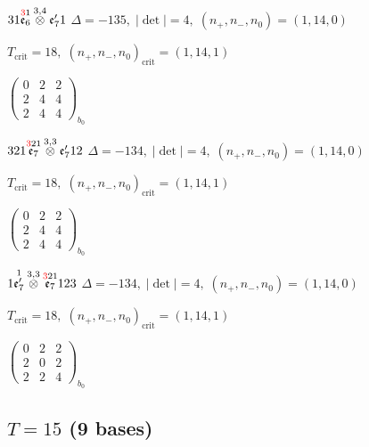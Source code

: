 \documentclass[10pt]{article}
\begin{document}
\smallskip

$31\overset{\textcolor{red}{3}1}{\mathfrak{e}_6}\overset{3,4}{\otimes}\mathfrak{e}_7'1$ \quad $\Delta=-135,\; |\det|=4,\; (n_+,n_-,n_0)=(1,14,0)$

\hspace{1em}$T_{\text{crit}}=18,\; (n_+,n_-,n_0)_{\text{crit}}=(1,14,1)$

\hspace{2em}$\left(\begin{smallmatrix}0 & 2 & 2 \\ 2 & 4 & 4 \\ 2 & 4 & 4\end{smallmatrix}\right)_{\!b_0}$

\smallskip

$321\overset{\textcolor{red}{3}21}{\mathfrak{e}_7}\overset{3,3}{\otimes}\mathfrak{e}_7'12$ \quad $\Delta=-134,\; |\det|=4,\; (n_+,n_-,n_0)=(1,14,0)$

\hspace{1em}$T_{\text{crit}}=18,\; (n_+,n_-,n_0)_{\text{crit}}=(1,14,1)$

\hspace{2em}$\left(\begin{smallmatrix}0 & 2 & 2 \\ 2 & 4 & 4 \\ 2 & 4 & 4\end{smallmatrix}\right)_{\!b_0}$

\smallskip

$1\overset{1}{\mathfrak{e}_7'}\overset{3,3}{\otimes}\overset{\textcolor{red}{3}21}{\mathfrak{e}_7}123$ \quad $\Delta=-134,\; |\det|=4,\; (n_+,n_-,n_0)=(1,14,0)$

\hspace{1em}$T_{\text{crit}}=18,\; (n_+,n_-,n_0)_{\text{crit}}=(1,14,1)$

\hspace{2em}$\left(\begin{smallmatrix}0 & 2 & 2 \\ 2 & 0 & 2 \\ 2 & 2 & 4\end{smallmatrix}\right)_{\!b_0}$


\subsection*{$T = 15$ \quad (9 bases)}
\smallskip
\end{document}
